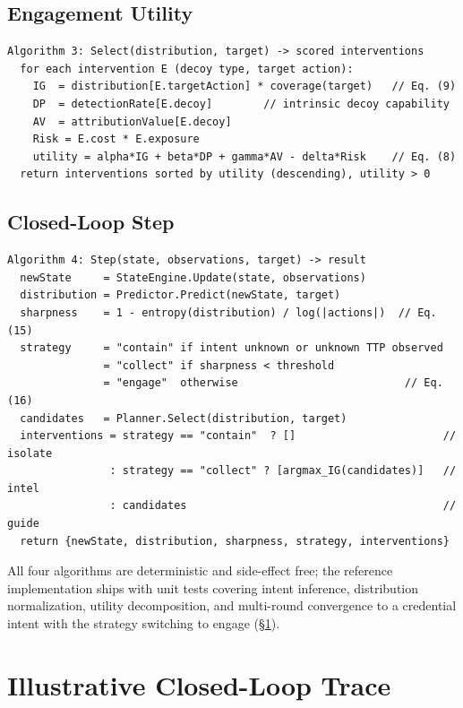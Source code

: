 \documentclass[11pt]{article}
\begin{document}
\subsection{Engagement Utility}
\label{sec:impl-select}

\begin{verbatim}
Algorithm 3: Select(distribution, target) -> scored interventions
  for each intervention E (decoy type, target action):
    IG  = distribution[E.targetAction] * coverage(target)   // Eq. (9)
    DP  = detectionRate[E.decoy]        // intrinsic decoy capability
    AV  = attributionValue[E.decoy]
    Risk = E.cost * E.exposure
    utility = alpha*IG + beta*DP + gamma*AV - delta*Risk    // Eq. (8)
  return interventions sorted by utility (descending), utility > 0
\end{verbatim}

\subsection{Closed-Loop Step}
\label{sec:impl-loop}

\begin{verbatim}
Algorithm 4: Step(state, observations, target) -> result
  newState     = StateEngine.Update(state, observations)
  distribution = Predictor.Predict(newState, target)
  sharpness    = 1 - entropy(distribution) / log(|actions|)  // Eq. (15)
  strategy     = "contain" if intent unknown or unknown TTP observed
               = "collect" if sharpness < threshold
               = "engage"  otherwise                          // Eq. (16)
  candidates   = Planner.Select(distribution, target)
  interventions = strategy == "contain"  ? []                       // isolate
                : strategy == "collect" ? [argmax_IG(candidates)]   // intel
                : candidates                                        // guide
  return {newState, distribution, sharpness, strategy, interventions}
\end{verbatim}

All four algorithms are deterministic and side-effect free; the reference
implementation ships with unit tests covering intent inference, distribution
normalization, utility decomposition, and multi-round convergence to a
credential intent with the strategy switching to engage
(\S\ref{sec:trace}).

\section{Illustrative Closed-Loop Trace}
\label{sec:trace}
\end{document}
